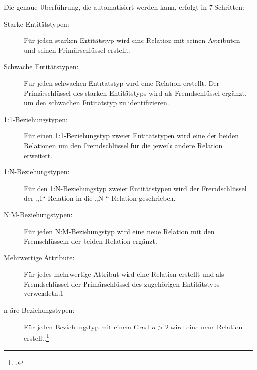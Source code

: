 \documentclass{lehramt-informatik-haupt}
\begin{document}
Die genaue Überführung, die automatisiert werden kann, erfolgt in 7
Schritten:

\begin{description}
\item[Starke Entitätstypen:] Für jeden starken Entitätstyp wird eine
Relation mit seinen Attributen und seinen Primärschlüssel erstellt.

\item[Schwache Entitätstypen:] Für jeden schwachen Entitätstyp wird eine
Relation erstellt. Der Primärschlüssel des starken Entitätstyps wird als
Fremdschlüssel ergänzt, um den schwachen Entitätstyp zu identifizieren.

\item[1:1-Beziehungstypen:] Für einen 1:1-Beziehungstyp zweier
Entitätstypen wird eine der beiden Relationen um den Fremdschlüssel
für die jeweils andere Relation erweitert.

\item[1:N-Beziehungstypen:] Für den 1:N-Beziehungstyp zweier
Entitätstypen wird der Fremdschlüssel der „1“-Relation in die „N
“-Relation geschrieben.

\item[N:M-Beziehungstypen:] Für jeden N:M-Beziehungstyp wird eine neue
Relation mit den Fremschlüsseln der beiden Relation ergänzt.

\item[Mehrwertige Attribute:] Für jedes mehrwertige Attribut wird eine
Relation erstellt und als Fremdschlüssel der Primärschlüssel des
zugehörigen Entitätstyps verwendetn.1

\item[n-äre Beziehungstypen:] Für jeden Beziehungstyp mit einem Grad $n
> 2$ wird eine neue Relation erstellt.\footcite[Überführung in ein
relationales Modell]{wiki:entity-relationship-modell}

\end{description}

\literatur
\end{document}
